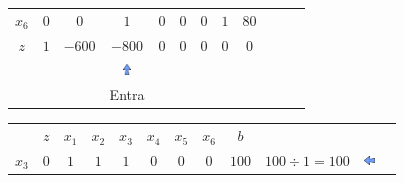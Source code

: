 \begin{frame}
{\begin{table}
\begin{tabular}{c c c c c c c c c c c c}
				\cellcolor{blue!80} \color{red} $ \scriptstyle x_6$
				& \cellcolor{yellow!60}  $ \scriptstyle 0$
				& \cellcolor{yellow!60}  $ \scriptstyle 0$ 
				& \cellcolor{gray!60}  $ \scriptstyle 1$
				& \cellcolor{yellow!60}  $ \scriptstyle 0$
				& \cellcolor{yellow!60}  $ \scriptstyle 0$
				& \cellcolor{yellow!60}  $ \scriptstyle 0$
				& \cellcolor{yellow!60}  $ \scriptstyle 1$ 
				& \cellcolor{yellow!60}  $ \scriptstyle 80$ \\
				\cellcolor{blue!80} \color{white} $ \scriptstyle z$
				& \cellcolor{yellow!60}  $ \scriptstyle 1$
				& \cellcolor{yellow!60}  $ \scriptstyle -600$ 
				& \cellcolor{gray!60}  $ \scriptstyle -800$
				& \cellcolor{yellow!60}  $ \scriptstyle 0$
				& \cellcolor{yellow!60}  $ \scriptstyle 0$
				& \cellcolor{yellow!60}  $ \scriptstyle 0$
				& \cellcolor{yellow!60}  $ \scriptstyle 0$ 
				& \cellcolor{yellow!60}  $ \scriptstyle 0$ \\
				& & & \includegraphics[width=0.3cm,height=0.3cm]{setacima.jpg} \\
				& & & \scriptsize Entra \\
			\end{tabular}
		\end{table}	
	}	
	{
		\begin{table}
			\begin{tabular}{c c c c c c c c c c c c}
				& \cellcolor{blue!80} \color{white} $ \scriptstyle z$
				& \cellcolor{blue!80} \color{white} $ \scriptstyle x_1$ 
				& \cellcolor{blue!80} \color{white} $ \scriptstyle x_2$
				& \cellcolor{blue!80} \color{red} $ \scriptstyle x_3$
				& \cellcolor{blue!80} \color{red} $ \scriptstyle x_4$
				& \cellcolor{blue!80} \color{red} $ \scriptstyle x_5$
				& \cellcolor{blue!80} \color{red} $ \scriptstyle x_6$ 
				& \cellcolor{blue!80} \color{white} $ \scriptstyle b$ \\
				\cellcolor{blue!80} \color{red} $ \scriptstyle x_3$
				& \cellcolor{yellow!60}  $ \scriptstyle 0$
				& \cellcolor{yellow!60}  $ \scriptstyle 1$ 
				& \cellcolor{gray!60}  $ \scriptstyle 1$
				& \cellcolor{yellow!60}  $ \scriptstyle 1$
				& \cellcolor{yellow!60}  $ \scriptstyle 0$
				& \cellcolor{yellow!60}  $ \scriptstyle 0$
				& \cellcolor{yellow!60}  $ \scriptstyle 0$ 
				& \cellcolor{gray!60}  $ \scriptstyle 100$
				& $ \scriptstyle 100 \div 1 = 100$ 
				& \includegraphics[width=0.3cm,height=0.3cm]{setaesquerda.jpg}\\ 

\end{tabular}
\end{table}}
\end{frame}
